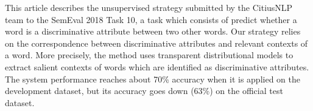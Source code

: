 This article describes the unsupervised strategy submitted by the CitiusNLP team to the SemEval 2018 Task 10, a task which consists of predict whether a word is a discriminative attribute between two other words. Our strategy relies on the correspondence between discriminative attributes and relevant contexts of a word. More precisely, the method uses transparent distributional models to extract salient contexts of words which are identified as discriminative attributes. The system performance reaches about 70\% accuracy when it is applied on the development dataset, but its accuracy goes down (63\%) on the official test dataset.
